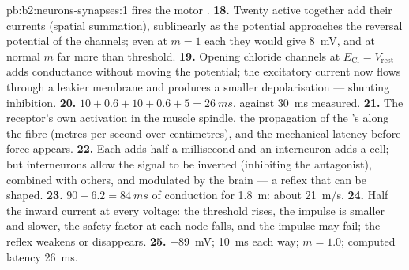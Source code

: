 \begin{solution}{pb:b2:neurons-synapses:1}
fires the motor .
\textbf{18.} Twenty  active together add their currents
(spatial summation), sublinearly as the potential approaches the
reversal potential of the channels; even at $m = 1$ each they would
give \qty{8}{mV}, and at normal $m$ far more than threshold.
\textbf{19.} Opening chloride channels at $E_{\mathrm{Cl}} = V_{\text{rest}}$
adds conductance without moving the potential; the excitatory
current now flows through a leakier membrane and produces a smaller
depolarisation --- shunting inhibition.
\textbf{20.} $10 + 0.6 + 10 + 0.6 + 5 = \qty{26}{ms}$, against
\qty{30}{ms} measured.
\textbf{21.} The receptor's own activation in the muscle spindle, the
propagation of the 's  along the fibre
(metres per second over centimetres), and the mechanical latency
before force appears.
\textbf{22.} Each  adds half a millisecond and an interneuron
adds a cell; but interneurons allow the signal to be inverted
(inhibiting the antagonist), combined with others, and modulated by
the brain --- a reflex that can be shaped.
\textbf{23.} $90 - 6.2 = \qty{84}{ms}$ of conduction for \qty{1.8}{m}:
about \qty{21}{m/s}.
\textbf{24.} Half the inward current at every voltage: the threshold
rises, the impulse is smaller and slower, the safety factor at each
node falls, and the impulse may fail; the reflex weakens or
disappears.
\textbf{25.}  \qty{-89}{mV}; \qty{10}{ms} each way;
$m = 1.0$; computed latency \qty{26}{ms}.
\end{solution}
